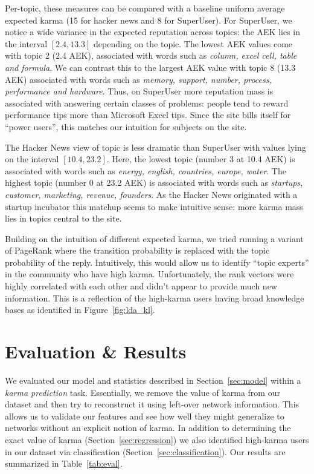 \documentclass[11pt]{article}
\begin{document}
Per-topic, these measures can be compared with a baseline uniform average
expected karma (15 for hacker news and 8 for SuperUser). For SuperUser, we
notice a wide variance in the expected reputation across topics: the AEK lies in
the interval $[2.4, 13.3]$ depending on the topic. The lowest AEK values come
with topic 2 (2.4 AEK), associated with words such as \textit{column, excel
cell, table and formula}. We can contrast this to the
largest AEK value with topic 8 (13.3 AEK) associated with words such as
\textit{memory, support, number, process, performance and hardware}. Thus, on
SuperUser more reputation mass is associated with answering certain classes of
problems: people tend to reward performance tips more than Microsoft Excel tips.
Since the site bills itself for ``power users'', this matches our intuition for
subjects on the site.

The Hacker News view of topic is less dramatic than SuperUser with values lying
on the interval $[10.4, 23.2]$. Here, the lowest topic (number 3 at 10.4 AEK) is
associated with words such as \textit{energy, english, countries, europe,
water}. The highest topic (number 0 at 23.2 AEK) is associated with words such
as \textit{startups, customer, marketing, revenue, founders}. As the Hacker News
originated with a startup incubator this matchup seems to make intuitive sense:
more karma mass lies in topics central to the site.

Building on the intuition of different expected karma, we tried running a variant of 
PageRank where the transition probability is replaced with the topic probability of 
the reply. Intuitively, this would allow us to identify ``topic experts'' in the 
community who have high karma. Unfortunately, the rank vectors were highly correlated
with each other and didn't appear to provide much new information. This is a reflection 
of the high-karma users having broad knowledge bases as identified in 
Figure~\ref{fig:lda_kl}.


\section{Evaluation \& Results}
\label{sec:eval}

We evaluated our model and statistics described in Section~\ref{sec:model}
within a \textit{karma prediction} task. Essentially, we remove the value of
karma from our dataset and then try to reconstruct it using left-over network
information. This allows us to validate our features and see how well they might
generalize to networks without an explicit notion of karma. In addition to
determining the exact value of karma (Section~\ref{sec:regression}) we also
identified high-karma users in our dataset via classification
(Section~\ref{sec:classification}). Our results are summarized in
Table~\ref{tab:eval}. 
\end{document}
